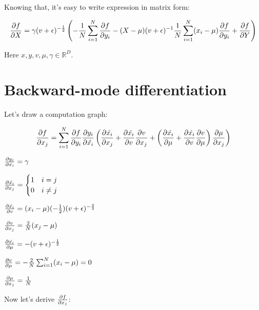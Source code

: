 \documentclass[12pt]{article}
\begin{document}
Knowing that, it's easy to write expression in matrix form:

\[
	\pdv{f}{X} = \gamma (v + \epsilon)^{-\frac{1}{2}} \left( -\frac{1}{N} \sum_{i=1}^{N} \pdv{f}{y_i} - (X - \mu) (v + \epsilon)^{-1} \frac{1}{N} \sum_{i=1}^{N} (x_i - \mu) \pdv{f}{y_i} + \pdv{f}{Y} \right) 
\]

Here $x, y, v, \mu, \gamma \in \mathbb{R}^D$.

\section{Backward-mode differentiation}

Let's draw a computation graph:


\[
	\pdv{f}{x_j} = 
	\sum_{i=1}^{N}
	\pdv{f}{y_i}
	\pdv{y_i}{\hat{x_i}} 
	\left( 
		\pdv{\hat{x_i}}{x_j} + 
		\pdv{\hat{x_i}}{v}\pdv{v}{x_j} + 
		\left( 
			\pdv{\hat{x_i}}{\mu} + 
			\pdv{\hat{x_i}}{v} \pdv{v}{\mu} 
		\right) 
		\pdv{\mu}{x_j} 
	\right) 
\]

$\pdv{y_i}{\hat{x_i}} = \gamma$

$
\pdv{\hat{x_i}}{x_j} = 
\begin{cases}
1 & \text{$i = j$} \\
0 & \text{$i \ne j$}
\end{cases}
$

$\pdv{\hat{x_i}}{v} = (x_i - \mu) (- \frac{1}{2}) (v + \epsilon)^{-\frac{3}{2}}$

$\pdv{v}{x_j} = \frac{2}{N} (x_j - \mu)$

$\pdv{\hat{x_i}}{\mu} = - (v + \epsilon)^{-\frac{1}{2}}$

$\pdv{v}{\mu} = - \frac{2}{N} \sum_{i=1}^{N} (x_i - \mu) = 0$

$\pdv{\mu}{x_j} = \frac{1}{N}$

Now let's derive $\pdv{f}{x_j}$:
\end{document}
